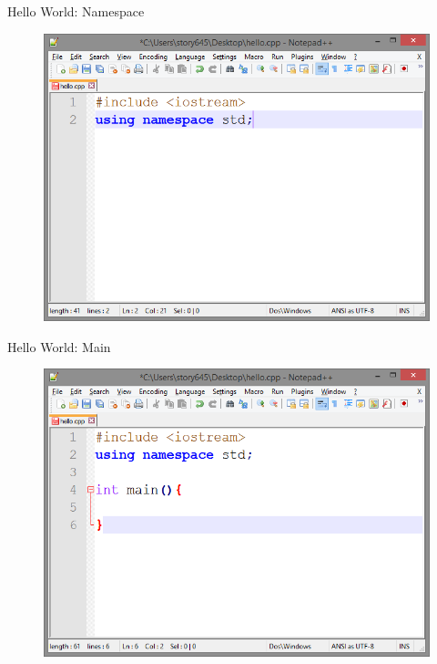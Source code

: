 \documentclass[xcolor={dvipsnames}]{beamer}
\begin{document}
\begin{frame}{Hello World: Namespace}
	\begin{figure}
			\includegraphics[width=1\textwidth]{namespace}
	\end{figure}
\end{frame}

\begin{frame}{Hello World: Main}
	\begin{figure}
			\includegraphics[width=1\textwidth]{main}
	\end{figure}
\end{frame}
\end{document}
